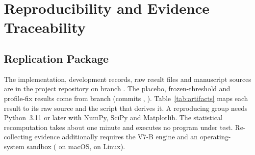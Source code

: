 \section{Reproducibility and Evidence Traceability}\label{sec:repro}

\subsection{Replication Package}
The implementation, development records, raw result files and manuscript sources are in the project repository on branch . The placebo, frozen-threshold and profile-fix results come from branch  (commits , ). Table~\ref{tab:artifacts} maps each result to its raw source and the script that derives it. A reproducing group needs Python~3.11 or later with NumPy, SciPy and Matplotlib. The statistical recomputation takes about one minute and executes no program under test. Re-collecting evidence additionally requires the V7-B engine and an operating-system sandbox ( on macOS,  on Linux).

